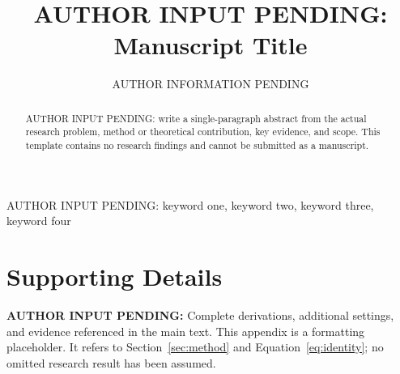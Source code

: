 \documentclass[journal]{IEEEtran}
\title{AUTHOR INPUT PENDING: Manuscript Title}\author{AUTHOR INFORMATION PENDING}
\newcommand{\AuthorPending}[1]{\textbf{AUTHOR INPUT PENDING:} #1}
\begin{document}
\maketitle
\begin{abstract}
AUTHOR INPUT PENDING: write a single-paragraph abstract from the actual research problem,
method or theoretical contribution, key evidence, and scope. This template contains
no research findings and cannot be submitted as a manuscript.
\end{abstract}
\begin{IEEEkeywords}AUTHOR INPUT PENDING: keyword one, keyword two, keyword three, keyword four\end{IEEEkeywords}


\appendix
\section{Supporting Details}
\label{app:supporting}
\AuthorPending{Complete derivations, additional settings, and evidence referenced in the main text.}
This appendix is a formatting placeholder. It refers to Section~\ref{sec:method} and
Equation~\ref{eq:identity}; no omitted research result has been assumed.
\end{document}
